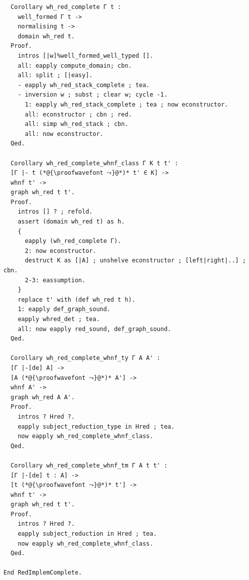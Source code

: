 \documentclass[10pt,a4paper]{amsart}
\begin{document}
\begin{lstlisting}
  Corollary wh_red_complete Γ t :
    well_formed Γ t ->
    normalising t ->
    domain wh_red t.
  Proof.
    intros [|w]%well_formed_well_typed [].
    all: eapply compute_domain; cbn.
    all: split ; [|easy].
    - eapply wh_red_stack_complete ; tea.
    - inversion w ; subst ; clear w; cycle -1.
      1: eapply wh_red_stack_complete ; tea ; now econstructor.
      all: econstructor ; cbn ; red.
      all: simp wh_red_stack ; cbn.
      all: now econstructor.
  Qed.

  Corollary wh_red_complete_whnf_class Γ K t t' :
  [Γ |- t (*@{\proofwavefont ⤳}@*)* t' ∈ K] ->
  whnf t' ->
  graph wh_red t t'.
  Proof.
    intros [] ? ; refold.
    assert (domain wh_red t) as h.
    {
      eapply (wh_red_complete Γ).
      2: now econstructor.
      destruct K as [|A] ; unshelve econstructor ; [left|right|..] ; cbn.
      2-3: eassumption.
    }
    replace t' with (def wh_red t h).
    1: eapply def_graph_sound.
    eapply whred_det ; tea.
    all: now eapply red_sound, def_graph_sound.
  Qed.
  
  Corollary wh_red_complete_whnf_ty Γ A A' :
  [Γ |-[de] A] ->
  [A (*@{\proofwavefont ⤳}@*)* A'] ->
  whnf A' ->
  graph wh_red A A'.
  Proof.
    intros ? Hred ?.
    eapply subject_reduction_type in Hred ; tea.
    now eapply wh_red_complete_whnf_class.
  Qed.
  
  Corollary wh_red_complete_whnf_tm Γ A t t' :
  [Γ |-[de] t : A] ->
  [t (*@{\proofwavefont ⤳}@*)* t'] ->
  whnf t' ->
  graph wh_red t t'.
  Proof.
    intros ? Hred ?.
    eapply subject_reduction in Hred ; tea.
    now eapply wh_red_complete_whnf_class.
  Qed.

End RedImplemComplete.
\end{lstlisting}
\end{document}
